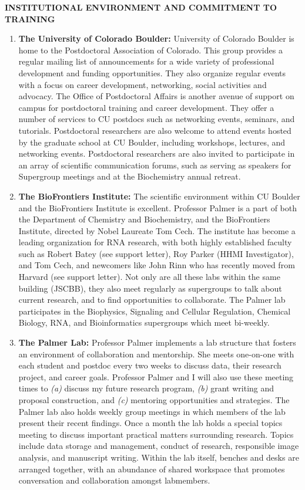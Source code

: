 \documentclass{F32}
\begin{document}
\begin{center}
{\bf INSTITUTIONAL ENVIRONMENT AND COMMITMENT TO TRAINING}
\end{center}

\begin{enumerate}
  \item \textbf{The University of Colorado Boulder:} University of Colorado Boulder is home to the Postdoctoral Association of Colorado. This group provides a regular mailing list of announcements for a wide variety of professional development and funding opportunities. They also organize regular events with a focus on career development, networking, social activities and advocacy. The Office of Postdoctoral Affairs is another avenue of support on campus for postdoctoral training and career development. They offer a number of services to CU postdocs such as networking events, seminars, and tutorials. Postdoctoral researchers are also welcome to attend events hosted by the graduate school at CU Boulder, including workshops, lectures, and networking events. Postdoctoral researchers are also invited to participate in an array of scientific communication forums, such as serving as speakers for Supergroup meetings and at the Biochemistry annual retreat.

  \item \textbf{The BioFrontiers Institute:} The scientific environment within CU Boulder and the BioFrontiers Institute is excellent. Professor Palmer is a part of both the Department of Chemistry and Biochemistry, and the BioFrontiers Institute, directed by Nobel Laureate Tom Cech. The institute has become a leading organization for RNA research, with both highly established faculty such as Robert Batey (see support letter), Roy Parker (HHMI Investigator), and Tom Cech, and newcomers like John Rinn who has recently moved from Harvard (see support letter). Not only are all these labs within the same building (JSCBB), they also meet regularly as supergroups to talk about current research, and to find opportunities to collaborate. The Palmer lab participates in the Biophysics, Signaling and Cellular Regulation, Chemical Biology, RNA, and Bioinformatics supergroups which meet bi-weekly.

  \item \textbf{The Palmer Lab:} Professor Palmer implements a lab structure that fosters an environment of collaboration and mentorship. She meets one-on-one with each student and postdoc every two weeks to discuss data, their research project, and career goals. Professor Palmer and I will also use these meeting times to \textit{(a)} discuss my future research program, \textit{(b)} grant writing and proposal construction, and \textit{(c)} mentoring opportunities and strategies.
  The Palmer lab also holds weekly group meetings in which members of the lab present their recent findings. Once a month the lab holds a special topics meeting to discuss important practical matters surrounding research. Topics include data storage and management, conduct of research, responsible image analysis, and manuscript writing.
  Within the lab itself, benches and desks are arranged together, with an abundance of shared workspace that promotes conversation and collaboration amongst labmembers.


\end{enumerate}
\end{document}
